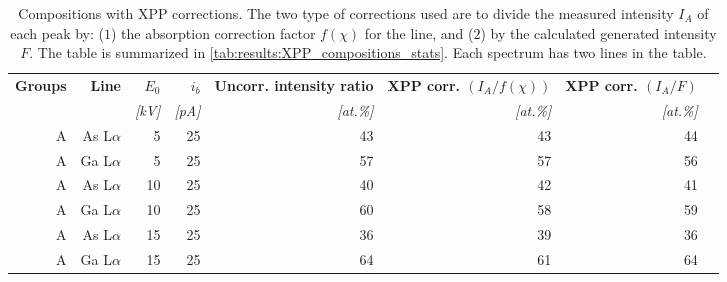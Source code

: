 \begin{table}[phtb]
    \begin{center}
        \caption{
            Compositions with XPP corrections.
            The two type of corrections used are to divide the measured intensity $I_A$ of each peak by: ($1$) the absorption correction factor $f(\chi)$ for the line, and ($2$) by the calculated generated intensity $F$.
            The table is summarized in \cref{tab:results:XPP_compositions_stats}.
            Each spectrum has two lines in the table.
        }
        \label{tab:results:XPP_compositions}
        \begin{tabular}{rrrrrrrr}
            \hline
            \textbf{Groups} & \textbf{Line} & \textbf{$E_0$} & \textbf{$i_b$} & \textbf{Uncorr. intensity ratio} & \textbf{XPP corr. $(I_A/f(\chi))$} & \textbf{XPP corr. $(I_A/F)$} \\
            \emph{}         & \emph{}       & \emph{[kV]}    & \emph{[pA]}    & \emph{[at.\%]}                    & \emph{[at.\%]}                      & \emph{[at.\%]}                \\
            \hline
            A               & As L$\alpha$  & 5              & 25             & 43                               & 43                                 & 44                           \\
            A               & Ga L$\alpha$  & 5              & 25             & 57                               & 57                                 & 56                           \\
            A               & As L$\alpha$  & 10             & 25             & 40                               & 42                                 & 41                           \\
            A               & Ga L$\alpha$  & 10             & 25             & 60                               & 58                                 & 59                           \\
            A               & As L$\alpha$  & 15             & 25             & 36                               & 39                                 & 36                           \\
            A               & Ga L$\alpha$  & 15             & 25             & 64                               & 61                                 & 64                           \\

\end{tabular}
\end{center}
\end{table}
